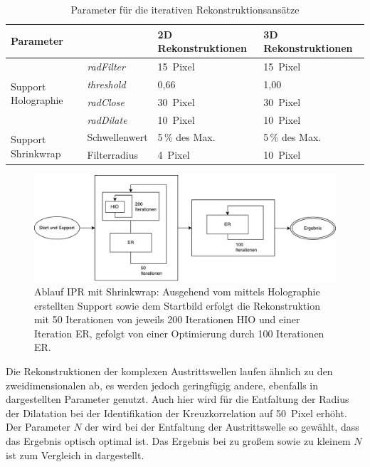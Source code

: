 \begin{table}[]
	\centering
	\caption{Parameter für die iterativen Rekonstruktionsansätze}
	\label{tab:param}
	\begin{tabular}{llll}
		\hline
		\multicolumn{2}{l}{Parameter} &2D Rekonstruktionen&3D Rekonstruktionen\\ 
		\hline
		\multirow{4}{*}{Support Holographie}&\textit{radFilter} & \SI{15}{Pixel} & \SI{15}{Pixel}\\
											&\textit{threshold} & 0,66           & 1,00\\
											&\textit{radClose}  & \SI{30}{Pixel} & \SI{30}{Pixel}\\
											&\textit{radDilate} & \SI{10}{Pixel} & \SI{10}{Pixel}\\
		\hline
		\multirow{2}{*}{Support Shrinkwrap}			&Schwellenwert      & 5\,\% des Max. & 5\,\% des Max.\\
											&Filterradius       & \SI{4}{Pixel}  & \SI{10}{Pixel}\\                
		\hline
	\end{tabular}
\vspace{1cm}
\end{table}




\begin{figure}
	\centering
	\includegraphics[width=.8\textwidth]{images/flow_holo.pdf}
	\caption[Ablauf IPR mit Holographie]{Ablauf IPR mit Shrinkwrap: Ausgehend vom mittels Holographie erstellten Support sowie dem Startbild erfolgt die Rekonstruktion mit 50 Iterationen von jeweils 200 Iterationen HIO und einer Iteration ER, gefolgt von einer Optimierung durch 100 Iterationen ER.}
	\label{fig:flow_holo}
\end{figure} 

\FloatBarrier

Die Rekonstruktionen der komplexen Austrittswellen laufen ähnlich zu den zweidimensionalen ab, es werden jedoch geringfügig andere, ebenfalls in  dargestellten Parameter genutzt. Auch hier wird für die Entfaltung der Radius der Dilatation bei der Identifikation der Kreuzkorrelation auf \SI{50}{Pixel} erhöht. Der Parameter $N$ der wird bei der Entfaltung der Austrittswelle so gewählt, dass das Ergebnis optisch optimal ist. Das Ergebnis bei zu großem sowie zu kleinem $N$ ist zum Vergleich in  dargestellt.


